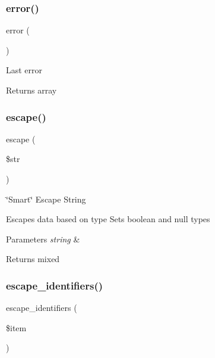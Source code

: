 \subsubsection{\texorpdfstring{error()}{error()}}
{\footnotesize\ttfamily error (\begin{DoxyParamCaption}{ }\end{DoxyParamCaption})}

Last error

\begin{DoxyReturn}{Returns}
array 
\end{DoxyReturn}
\mbox{\label{class_c_i___d_b__driver_ac8f37ca5703d4558c732e692194f8cd6}} 
\subsubsection{\texorpdfstring{escape()}{escape()}}
{\footnotesize\ttfamily escape (\begin{DoxyParamCaption}\item[{}]{\$str }\end{DoxyParamCaption})}

\char`\"{}\+Smart\char`\"{} Escape String

Escapes data based on type Sets boolean and null types


\begin{DoxyParams}{Parameters}
{\em string} & \\
\hline
\end{DoxyParams}
\begin{DoxyReturn}{Returns}
mixed 
\end{DoxyReturn}
\mbox{\label{class_c_i___d_b__driver_abe5c555644f8bac97c3f84c7d2325fdc}} 
\subsubsection{\texorpdfstring{escape\+\_\+identifiers()}{escape\_identifiers()}}
{\footnotesize\ttfamily escape\+\_\+identifiers (\begin{DoxyParamCaption}\item[{}]{\$item }\end{DoxyParamCaption})}

